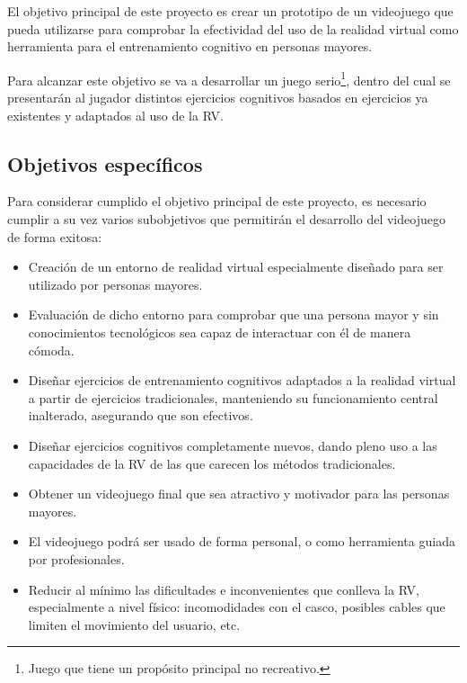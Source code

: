 El objetivo principal de este proyecto es crear un prototipo de un videojuego que pueda utilizarse para comprobar la efectividad del uso de la realidad virtual como herramienta para el entrenamiento cognitivo en personas mayores.

Para alcanzar este objetivo se va a desarrollar un juego serio\footnote{Juego que tiene un propósito principal no recreativo.}, dentro del cual se presentarán al jugador distintos ejercicios cognitivos basados en ejercicios ya existentes y adaptados al uso de la RV.


\subsection{Objetivos específicos}

Para considerar cumplido el objetivo principal de este proyecto, es necesario cumplir a su vez varios subobjetivos que permitirán el desarrollo del videojuego de forma exitosa:


\begin{itemize}
	\item{Creación de un entorno de realidad virtual especialmente diseñado para ser utilizado por personas mayores.}

	\item{Evaluación de dicho entorno para comprobar que una persona mayor y sin conocimientos tecnológicos sea capaz de interactuar con él de manera cómoda.}

	\item{Diseñar ejercicios de entrenamiento cognitivos adaptados a la realidad virtual a partir de ejercicios tradicionales, manteniendo su funcionamiento central inalterado, asegurando que son efectivos.}

	\item{Diseñar ejercicios cognitivos completamente nuevos, dando pleno uso a las capacidades de la RV de las que carecen los métodos tradicionales.}

	\item{Obtener un videojuego final que sea atractivo y motivador para las personas mayores.}

	\item{El videojuego podrá ser usado de forma personal, o como herramienta guiada por profesionales.}

	\item{Reducir al mínimo las dificultades e inconvenientes que conlleva la RV, especialmente a nivel físico: incomodidades con el casco, posibles cables que limiten el movimiento del usuario, etc.}


\end{itemize}


